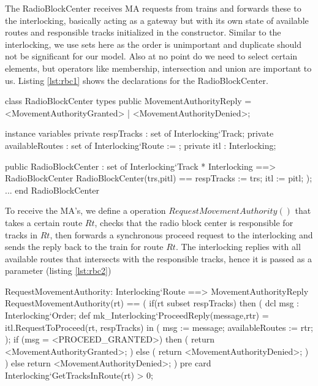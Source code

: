 \documentclass[preprint,12pt]{elsarticle}
\begin{document}
The RadioBlockCenter receives MA requests from trains and forwards these to the interlocking, basically acting as a gateway but with its own state of available routes and responsible tracks initialized in the constructor. Similar to the interlocking, we use sets here as the order is unimportant and duplicate should not be significant for our model. Also at no point do we need to select certain elements, but operators like membership, intersection and union are important to us. Listing \ref{lst:rbc1} shows the declarations for the RadioBlockCenter.

\begin{vdmsl}[label=lst:rbc1,caption=Definition of class state and constructor for RadioBlockCenter.]
	class RadioBlockCenter
	types
	public MovementAuthorityReply =
	 <MovementAuthorityGranted> | <MovementAuthorityDenied>;
	
	instance variables
	private respTracks : set of Interlocking`Track;
	private availableRoutes : set of Interlocking`Route := {};
	private itl : Interlocking;
	
	public RadioBlockCenter : set of Interlocking`Track
	* Interlocking ==> RadioBlockCenter
	RadioBlockCenter(trs,pitl) ==
		respTracks := trs;
		itl := pitl;
	);
	...
	end RadioBlockCenter
\end{vdmsl}

To receive the MA's, we define a operation $RequestMovementAuthority()$ that takes a certain route $Rt$, checks that the radio block center is responsible for tracks in $Rt$, then forwards a synchronous proceed request to the interlocking and sends the reply back to the train for route $Rt$. The interlocking replies with all available routes that intersects with the responsible tracks, hence it is passed as a parameter (listing \ref{lst:rbc2})

\begin{vdmsl}[label=lst:rbc2,caption=Definition of the public.]
	RequestMovementAuthority: Interlocking`Route
	 ==> MovementAuthorityReply
	RequestMovementAuthority(rt) ==
	(
	if(rt subset respTracks) then (
		dcl msg : Interlocking`Order;
		def mk_Interlocking`ProceedReply(message,rtr)
			 = itl.RequestToProceed(rt, respTracks)
		in ( msg := message; availableRoutes := rtr; );
			if (msg = <PROCEED_GRANTED>)
				then ( return <MovementAuthorityGranted>; )
			else (
				return <MovementAuthorityDenied>;
			)
		) else return <MovementAuthorityDenied>;
	) pre card Interlocking`GetTracksInRoute(rt) > 0;
\end{vdmsl}
\end{document}
